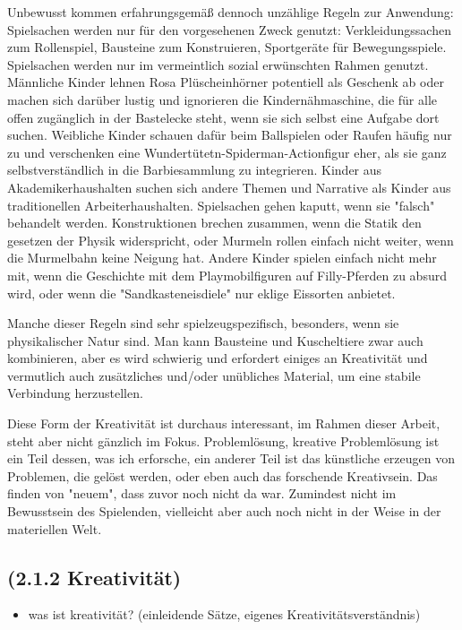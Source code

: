 \documentclass[11pt,a4paper,twoside]{scrreprt}
\begin{document}
Unbewusst kommen erfahrungsgemäß dennoch unzählige Regeln zur Anwendung: 
Spielsachen werden nur für den vorgesehenen Zweck genutzt: Verkleidungssachen zum Rollenspiel, Bausteine zum Konstruieren, Sportgeräte für Bewegungsspiele. 
Spielsachen werden nur im vermeintlich sozial erwünschten Rahmen genutzt. Männliche Kinder lehnen Rosa Plüscheinhörner potentiell als Geschenk ab oder machen sich darüber lustig und ignorieren die Kindernähmaschine, die für alle offen zugänglich in der Bastelecke steht, wenn sie sich selbst eine Aufgabe dort suchen. Weibliche Kinder schauen dafür beim Ballspielen oder Raufen häufig nur zu und verschenken eine Wundertütetn-Spiderman-Actionfigur eher, als sie ganz selbstverständlich in die Barbiesammlung zu integrieren. Kinder aus Akademikerhaushalten suchen sich andere Themen und Narrative als Kinder aus traditionellen Arbeiterhaushalten. 
Spielsachen gehen kaputt, wenn sie "falsch" behandelt werden. Konstruktionen brechen zusammen, wenn die Statik den gesetzen der Physik widerspricht, oder Murmeln rollen einfach nicht weiter, wenn die Murmelbahn keine Neigung hat. Andere Kinder spielen einfach nicht mehr mit, wenn die Geschichte mit dem Playmobilfiguren auf Filly-Pferden zu absurd wird, oder wenn die "Sandkasteneisdiele" nur eklige Eissorten anbietet. 

Manche dieser Regeln sind sehr spielzeugspezifisch, besonders, wenn sie physikalischer Natur sind. Man kann Bausteine und Kuscheltiere zwar auch kombinieren, aber es wird schwierig und erfordert einiges an Kreativität und vermutlich auch zusätzliches und/oder unübliches Material, um eine stabile Verbindung herzustellen.

Diese Form der Kreativität ist durchaus interessant, im Rahmen dieser Arbeit, steht aber nicht gänzlich im Fokus. Problemlösung, kreative Problemlösung ist ein Teil dessen, was ich erforsche, ein anderer Teil ist das künstliche erzeugen von Problemen, die gelöst werden, oder eben auch das forschende Kreativsein. Das finden von "neuem", dass zuvor noch nicht da war. Zumindest nicht im Bewusstsein des Spielenden, vielleicht aber auch noch nicht in der Weise in der materiellen Welt. 

\subsection{(2.1.2 Kreativität)}
		\begin{itemize}
			\item was ist kreativität? (einleidende Sätze, eigenes Kreativitätsverständnis)
		\end{itemize}
\end{document}
